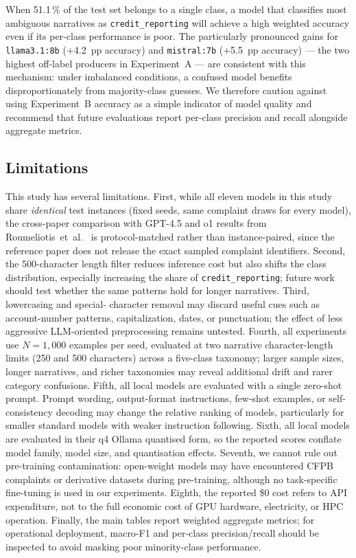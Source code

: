 \documentclass[a4paper,fleqn]{cas-dc}
\begin{document}
When 51.1\,\% of the test set belongs to a single class, a model
that classifies most ambiguous narratives as \texttt{credit\_reporting}
will achieve a high weighted accuracy even if its per-class performance
is poor. The particularly pronounced gains for \texttt{llama3.1:8b}
(+4.2~pp accuracy) and \texttt{mistral:7b} (+5.5~pp accuracy) --- the
two highest off-label producers in Experiment~A --- are consistent
with this mechanism: under imbalanced conditions, a confused model
benefits disproportionately from majority-class guesses. We therefore
caution against using Experiment~B accuracy as a simple indicator of
model quality and recommend that future evaluations report per-class
precision and recall alongside aggregate metrics.

\subsection{Limitations}

This study has several limitations. First, while all eleven models
in this study share \emph{identical} test instances (fixed seeds,
same complaint draws for every model), the cross-paper comparison
with GPT-4.5 and o1 results from Roumeliotis~et~al.\
\cite{roumeliotis2025think} is protocol-matched rather than
instance-paired, since the reference paper does not release the
exact sampled complaint identifiers.
Second, the 500-character length filter reduces inference cost but
also shifts the class distribution, especially increasing the share of
\texttt{credit\_reporting}; future work should test whether the same
patterns hold for longer narratives. Third, lowercasing and special-
character removal may discard useful cues such as account-number
patterns, capitalization, dates, or punctuation; the effect of less
aggressive LLM-oriented preprocessing remains untested. Fourth, all
experiments use $N{=}1{,}000$ examples per seed, evaluated at two
narrative character-length limits (250 and 500 characters) across a
five-class taxonomy; larger sample sizes, longer narratives, and richer
taxonomies may reveal additional drift and rarer category confusions.
Fifth, all local models are evaluated with a single zero-shot prompt.
Prompt wording, output-format instructions, few-shot examples, or
self-consistency decoding may change the relative ranking of models,
particularly for smaller standard models with weaker instruction
following. Sixth, all local models are evaluated in their q4 Ollama
quantised form, so the reported scores conflate model family, model
size, and quantisation effects. Seventh, we cannot rule out pre-training
contamination: open-weight models may have encountered CFPB complaints
or derivative datasets during pre-training, although no task-specific
fine-tuning is used in our experiments. Eighth, the reported \$0 cost
refers to API expenditure, not to the full economic cost of GPU
hardware, electricity, or HPC operation. Finally, the main tables
report weighted aggregate metrics; for operational deployment,
macro-F1 and per-class precision/recall should be inspected to avoid
masking poor minority-class performance.
\end{document}
